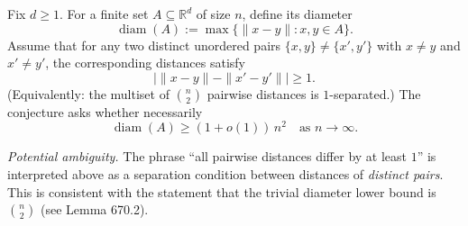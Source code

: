 Fix $d\ge 1$.
For a finite set $A\subseteq\mathbb{R}^d$ of size $n$, define its diameter
\[\operatorname{diam}(A):=\max\{\|x-y\|: x,y\in A\}.
\]
Assume that for any two distinct unordered pairs $\{x,y\}\ne\{x',y'\}$ with $x\ne y$ and $x'\ne y'$, the corresponding distances satisfy
\[\big|\|x-y\| - \|x'-y'\|\big|\ge 1.
\]
(Equivalently: the multiset of $\binom{n}{2}$ pairwise distances is $1$-separated.)
The conjecture asks whether necessarily
\[
\operatorname{diam}(A) \ge (1+o(1))\, n^2\quad\text{as } n\to\infty.
\]

\medskip
\noindent\emph{Potential ambiguity.}
The phrase ``all pairwise distances differ by at least $1$'' is interpreted above as a separation condition between distances of \emph{distinct pairs}. This is consistent with the statement that the trivial diameter lower bound is $\binom n2$ (see Lemma 670.2).
